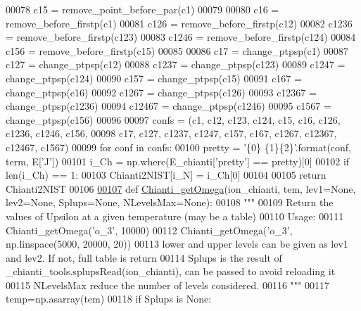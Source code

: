 \begin{DoxyCode}
00078         c15 = remove\_point\_before\_par(c1) 
00079         
00080         c16 = remove\_before\_firstp(c1)
00081         c126 = remove\_before\_firstp(c12)
00082         c1236 = remove\_before\_firstp(c123)
00083         c1246 = remove\_before\_firstp(c124)
00084         c156 = remove\_before\_firstp(c15)
00085         
00086         c17 = change\_ptpsp(c1)
00087         c127 = change\_ptpsp(c12)
00088         c1237 = change\_ptpsp(c123)
00089         c1247 = change\_ptpsp(c124)
00090         c157 = change\_ptpsp(c15)
00091         c167 = change\_ptpsp(c16)
00092         c1267 = change\_ptpsp(c126)
00093         c12367 = change\_ptpsp(c1236)
00094         c12467 = change\_ptpsp(c1246)
00095         c1567 = change\_ptpsp(c156)
00096        
00097         confs = (c1, c12, c123, c124, c15, c16, c126, c1236, c1246, c156,
00098                  c17, c127, c1237, c1247, c157, c167, c1267, c12367, c12467, c1567)
00099         \textcolor{keywordflow}{for} conf \textcolor{keywordflow}{in} confs:   
00100             pretty = \textcolor{stringliteral}{'\{0\} \{1\}\{2\}'}.format(conf, term, E[\textcolor{stringliteral}{'J'}])
00101             i\_Ch = np.where(E\_chianti[\textcolor{stringliteral}{'pretty'}] == pretty)[0]
00102             \textcolor{keywordflow}{if} len(i\_Ch) == 1:
00103                 Chianti2NIST[i\_N] = i\_Ch[0]
00104                         
00105     \textcolor{keywordflow}{return} Chianti2NIST
00106         
\hypertarget{pn__chianti_8py_source_l00107}{}\hyperlink{namespacepyneb_1_1utils_1_1pn__chianti_a651b939729d0f5afb817a47a974bfaa1}{00107} \textcolor{keyword}{def }\hyperlink{namespacepyneb_1_1utils_1_1pn__chianti_a651b939729d0f5afb817a47a974bfaa1}{Chianti\_getOmega}(ion\_chianti, tem, lev1=None, lev2=None, Splups=None, NLevelsMax=None):
00108     \textcolor{stringliteral}{"""}
00109 \textcolor{stringliteral}{    Return the values of Upsilon at a given temperature (may be a table)}
00110 \textcolor{stringliteral}{    Usage:}
00111 \textcolor{stringliteral}{        Chianti\_getOmega('o\_3', 10000)}
00112 \textcolor{stringliteral}{        Chianti\_getOmega('o\_3', np.linspace(5000, 20000, 20))}
00113 \textcolor{stringliteral}{    lower and upper levels can be given as lev1 and lev2. If not, full table is return}
00114 \textcolor{stringliteral}{    Splups is the result of \_chianti\_tools.splupsRead(ion\_chianti), can be passed to avoid reloading it}
00115 \textcolor{stringliteral}{    NLevelsMax reduce the number of levels considered.}
00116 \textcolor{stringliteral}{    """}
00117     temp=np.asarray(tem)
00118     \textcolor{keywordflow}{if} Splups \textcolor{keywordflow}{is} \textcolor{keywordtype}{None}:

\end{DoxyCode}
